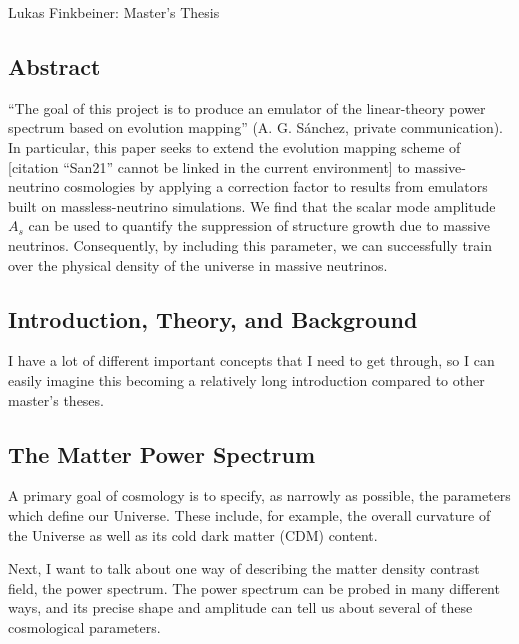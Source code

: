 \documentclass[11pt]{article}
\newcommand{\cbib}[1]
{\IfFileExists{biblatex.sty}
{\cite{#1}}
{[citation ``#1'' cannot be linked in the current environment]}}
\begin{document}
\fontsize{12}{15}

\begin{center}
Lukas Finkbeiner: Master's Thesis
\end{center}

\tableofcontents

\begin{centering}
\section{Abstract}
\end{centering}

``The goal of this project is to produce an emulator of the linear-theory
power spectrum based on evolution mapping'' (A. G. S\'{a}nchez, private
communication). In particular, this paper seeks to extend the evolution mapping
scheme of \cbib{San21} to massive-neutrino cosmologies by applying a correction
factor to results from emulators built on massless-neutrino simulations.  We find that the scalar mode amplitude $A_s$ can be used to quantify the suppression of structure growth due to massive neutrinos. Consequently, by including this parameter, we can successfully train over the physical density of the universe in massive neutrinos.

\begin{centering}
\section{Introduction, Theory, and Background}
\end{centering}

I have a lot of different important concepts that I need to get through, so I can easily imagine this becoming a relatively long introduction compared to other master's theses.

\begin{centering}
\subsection{The Matter Power Spectrum}
\end{centering}

A primary goal of cosmology is to specify, as narrowly as possible, the parameters which define our Universe. These include, for example, the overall curvature of the Universe as well as its cold dark matter (CDM) content.

Next, I want to talk about one way of describing the matter density contrast field, the power spectrum. The power spectrum can be probed in many different ways, and its precise shape and amplitude can tell us about several of these cosmological parameters.
\end{document}
